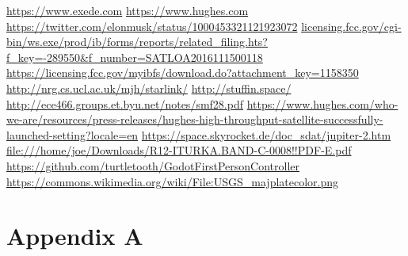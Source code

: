 \documentclass[12pt]{article}
\begin{document}
\begin{thebibliography}{99}
	 \url{https://www.exede.com}
	 \url{https://www.hughes.com}
	 \url{https://twitter.com/elonmusk/status/1000453321121923072}
	 \url{licensing.fcc.gov/cgi-bin/ws.exe/prod/ib/forms/reports/related_filing.hts?f_key=-289550&f_number=SATLOA2016111500118}
	 \url{https://licensing.fcc.gov/myibfs/download.do?attachment_key=1158350}
	 \url{http://nrg.cs.ucl.ac.uk/mjh/starlink/}
	 \url{http://stuffin.space/}
	 \url{http://ece466.groups.et.byu.net/notes/smf28.pdf}
	 \url{https://www.hughes.com/who-we-are/resources/press-releases/hughes-high-throughput-satellite-successfully-launched-setting?locale=en}
	 \url{https://space.skyrocket.de/doc_sdat/jupiter-2.htm}
	 \url{file:///home/joe/Downloads/R12-ITURKA.BAND-C-0008!!PDF-E.pdf}
	 \url{https://github.com/turtletooth/GodotFirstPersonController}
	 \url{https://commons.wikimedia.org/wiki/File:USGS_majplatecolor.png}
\end{thebibliography}
\appendix

\section{Appendix A}

\printindex

\end{document}
